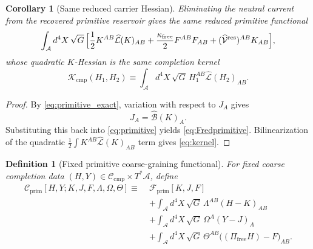 \documentclass[11pt]{article}
\newcommand{\Sub}{\mathcal A}
\newcommand{\ResidualLift}{\widehat{\mathcal V}^{\mathrm{res}}}
\newcommand{\SubGaugeVec}{\widehat{\mathcal B}}
\newcommand{\SubReducedEin}{\widehat{\mathcal L}}
\newcommand{\FreeProj}{\Pi_{\mathrm{free}}}
\newcommand{\GaugeAux}{Y}
\newcommand{\CompClass}{\mathscr C_{\mathrm{cmp}}}
\newcommand{\CompKernel}{\mathscr K_{\mathrm{cmp}}}
\newcommand{\PrimFunctional}{\mathscr F_{\mathrm{prim}}}
\newcommand{\FreeStiff}{\kappa_{\mathrm{free}}}
\newcommand{\PrimStrain}{K}
\newcommand{\PrimNeutral}{J}
\newcommand{\PrimFree}{F}
\newcommand{\StrainMult}{\Lambda}
\newcommand{\NeutralMult}{\Omega}
\newcommand{\FreeMult}{\Theta}
\newtheorem{definition}{Definition}
\newtheorem{corollary}{Corollary}
\begin{document}
\begin{corollary}[Same reduced carrier Hessian]
\label{cor:hessian}
Eliminating the neutral current from the recovered primitive reservoir gives the same reduced primitive functional
\begin{equation}
\begin{aligned}
\int_{\Sub} d^4X\,\sqrt{G}\,
\Bigl[
\frac12 \PrimStrain^{AB}\SubReducedEin(\PrimStrain)_{AB}
+\frac{\FreeStiff}{2}\PrimFree^{AB}\PrimFree_{AB}
+(\ResidualLift)^{AB}\PrimStrain_{AB}
\Bigr],
\end{aligned}
\label{eq:Fredprimitive}
\end{equation}
whose quadratic \(\PrimStrain\)-Hessian is the same completion kernel
\begin{equation}
\CompKernel(H_1,H_2)
\equiv
\int_{\Sub} d^4X\,\sqrt{G}\,
H_1^{AB}\SubReducedEin(H_2)_{AB}.
\label{eq:kernel}
\end{equation}
\end{corollary}

\begin{proof}
By \eqref{eq:primitive_exact}, variation with respect to \(\PrimNeutral_A\) gives
\[
\PrimNeutral_A=\SubGaugeVec(\PrimStrain)_A.
\]
Substituting this back into \eqref{eq:primitive} yields \eqref{eq:Fredprimitive}. Bilinearization of the quadratic \(\frac12\int \PrimStrain^{AB}\SubReducedEin(\PrimStrain)_{AB}\) term gives \eqref{eq:kernel}.
\end{proof}

\begin{definition}[Fixed primitive coarse-graining functional]
\label{def:prim_cg}
For fixed coarse completion data \((H,\GaugeAux)\in\CompClass\times T^*\Sub\), define
\begin{equation}
\begin{aligned}
\mathscr C_{\mathrm{prim}}[H,\GaugeAux;\PrimStrain,\PrimNeutral,\PrimFree,\StrainMult,\NeutralMult,\FreeMult]
\equiv\;
&\PrimFunctional[\PrimStrain,\PrimNeutral,\PrimFree]
\\
&+\int_{\Sub} d^4X\,\sqrt{G}\,
\StrainMult^{AB}(H-\PrimStrain)_{AB}
\\
&+\int_{\Sub} d^4X\,\sqrt{G}\,
\NeutralMult^A(\GaugeAux-\PrimNeutral)_A
\\
&+\int_{\Sub} d^4X\,\sqrt{G}\,
\FreeMult^{AB}\bigl((\FreeProj H)-\PrimFree\bigr)_{AB}.
\end{aligned}
\label{eq:Cprim}
\end{equation}
\end{definition}
\end{document}
